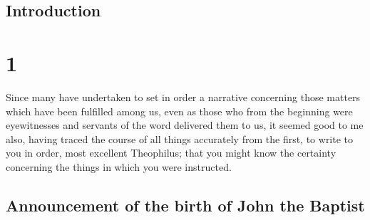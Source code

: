 \hypertarget{introduction}{%
\subsection{Introduction}\label{introduction}}

\hypertarget{section}{%
\section{1}\label{section}}

 Since many have undertaken to set in order a narrative
concerning those matters which have been fulfilled among us,
 even as those who from the beginning were eyewitnesses
and servants of the word delivered them to us,  it seemed
good to me also, having traced the course of all things accurately from
the first, to write to you in order, most excellent Theophilus;
 that you might know the certainty concerning the things
in which you were instructed.

\hypertarget{announcement-of-the-birth-of-john-the-baptist}{%
\subsection{Announcement of the birth of John the
Baptist}\label{announcement-of-the-birth-of-john-the-baptist}}

